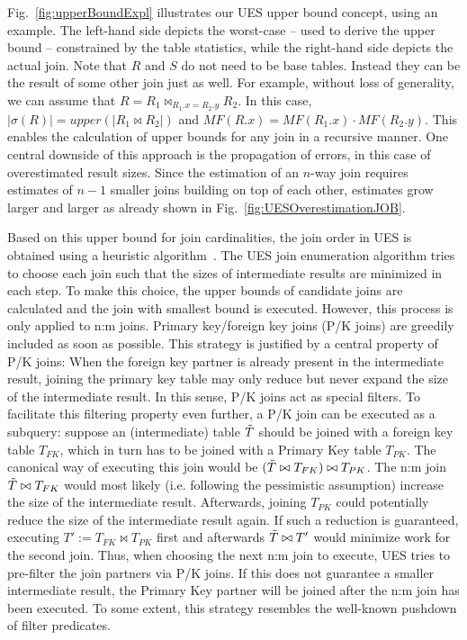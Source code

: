 Fig.~\ref{fig:upperBoundExpl} illustrates our UES upper bound concept, using an example. 
The left-hand side depicts the worst-case -- used to derive the upper bound -- constrained by the table statistics, while the right-hand side depicts the actual join.
Note that $R$ and $S$ do not need to be base tables. 
Instead they can be the result of some other join just as well. 
For example, without loss of generality, we can assume that $R = R_1 \bowtie_{R_1.x = R_2.y} R_2$. 
In this case, $|\sigma(R)| = upper(|R_1 \bowtie R_2|)$ and $MF(R.x) = MF(R_1.x) \cdot MF(R_2.y)$. 
This enables the calculation of upper bounds for any join in a recursive manner. 
One central downside of this approach is the propagation of errors, in this case of overestimated result sizes. 
Since the estimation of an $n$-way join requires estimates of $n-1$ smaller joins building on top of each other, estimates grow larger and larger as already shown in Fig.~\ref{fig:UESOverestimationJOB}.

Based on this upper bound for join cardinalities, the join order in UES is obtained using a heuristic algorithm~\cite{hertzschuch-21-ues}.
The UES join enumeration algorithm tries to choose each join such that the sizes of intermediate results are minimized in each step. 
To make this choice, the upper bounds of candidate joins are calculated and the join with smallest bound is executed. 
However, this process is only applied to n:m joins. 
Primary key/foreign key joins (P/K joins) are greedily included as soon as possible. 
This strategy is justified by a central property of P/K joins: When the foreign key partner is already present in the intermediate result, joining the primary key table may only reduce but never expand the size of the intermediate result. In this sense, P/K joins act as special filters. 
To facilitate this filtering property even further, a P/K join can be executed as a subquery: suppose an (intermediate) table $\Tilde{T}$ should be joined with a foreign key table $T_{FK}$, which in turn has to be joined with a Primary Key table $T_{PK}$. 
The canonical way of executing this join would be $(\Tilde{T} \bowtie T_{FK}) \bowtie T_{PK}$. The n:m join $\Tilde{T} \bowtie T_{FK}$ would most likely (i.e. following the pessimistic assumption) increase the size of the intermediate result. 
Afterwards, joining $T_{PK}$ could potentially reduce the size of the intermediate result again. 
If such a reduction is guaranteed, executing $T' := T_{FK} \bowtie T_{PK}$ first and afterwards $\Tilde{T} \bowtie T'$ would minimize work for the second join. Thus, when choosing the next n:m join to execute, UES tries to pre-filter the join partners via P/K joins. 
If this does not guarantee a smaller intermediate result, the Primary Key partner will be joined after the n:m join has been executed. To some extent, this strategy resembles the well-known pushdown of filter predicates.

